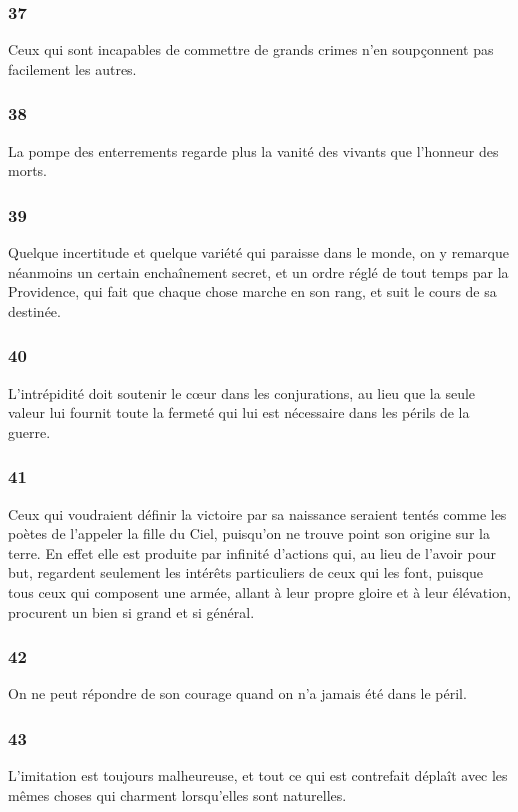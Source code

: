 \documentclass[french,twoside]{book} %
\begin{document}
\subsubsection[{37}]{ \textsc{37} }
\noindent Ceux qui sont incapables de commettre de grands crimes n’en soupçonnent pas facilement les autres.
\subsubsection[{38}]{ \textsc{38} }
\noindent La pompe des enterrements regarde plus la vanité des vivants que l’honneur des morts.
\subsubsection[{39}]{ \textsc{39} }
\noindent Quelque incertitude et quelque variété qui paraisse dans le monde, on y remarque néanmoins un certain enchaînement secret, et un ordre réglé de tout temps par la Providence, qui fait que chaque chose marche en son rang, et suit le cours de sa destinée.
\subsubsection[{40}]{ \textsc{40} }
\noindent L’intrépidité doit soutenir le cœur dans les conjurations, au lieu que la seule valeur lui fournit toute la fermeté qui lui est nécessaire dans les périls de la guerre.
\subsubsection[{41}]{ \textsc{41} }
\noindent Ceux qui voudraient définir la victoire par sa naissance seraient tentés comme les poètes de l’appeler la fille du Ciel, puisqu’on ne trouve point son origine sur la terre. En effet elle est produite par infinité d’actions qui, au lieu de l’avoir pour but, regardent seulement les intérêts particuliers de ceux qui les font, puisque tous ceux qui composent une armée, allant à leur propre gloire et à leur élévation, procurent un bien si grand et si général.
\subsubsection[{42}]{ \textsc{42} }
\noindent On ne peut répondre de son courage quand on n’a jamais été dans le péril.
\subsubsection[{43}]{ \textsc{43} }
\noindent L’imitation est toujours malheureuse, et tout ce qui est contrefait déplaît avec les mêmes choses qui charment lorsqu’elles sont naturelles.
\end{document}
